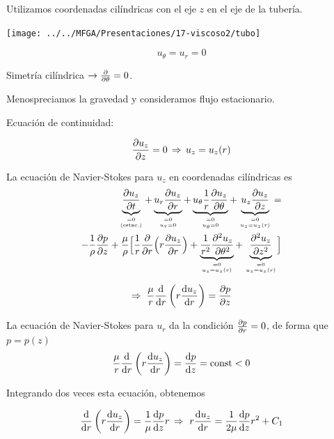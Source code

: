 	Utilizamos coordenadas cilíndricas con el eje $z$ en el eje de la
	tubería.

\begin{center}
	\texttt{[image: ../../MFGA/Presentaciones/17-viscoso2/tubo]}
\end{center}

			
			
\begin{equation}
				u_{\theta}=u_{r}=0
\end{equation}
			
			
			Simetría cilíndrica $\rightarrow\frac{\partial }{\partial \theta}=0$.
			
			Menospreciamos la gravedad y consideramos flujo estacionario.
			
			Ecuación de continuidad: 
			
\begin{equation}
				\frac{\partial u_{z}}{\partial z}=0\,\Rightarrow\,u_{z}=u_{z}(r)
\end{equation}
			
	
	La ecuación de Navier-Stokes para $u_{z}$ en coordenadas cilíndricas
	es
	\[
	\begin{split}\underbrace{\dparc{u_{z}}{t}}_{\binom{=0}{\text{(estac.)}}}+\underbrace{u_{r}\dparc{u_{z}}{r}}_{\binom{=0}{u_{r}=0}}+\underbrace{u_{\theta}\frac{1}{r}\dparc{u_{z}}{\theta}}_{\binom{=0}{u_{\theta}=0}}+\underbrace{u_{z}\dparc{u_{z}}{z}}_{\binom{=0}{u_{z}=u_{z}(r)}}=\\
		-\frac{1}{\rho}\dparc{p}{z}+\frac{\mu}{\rho}\Bigl[\frac{1}{r}\dparc{}{r}\Bigl(r\dparc{u_{z}}{r}\Bigr)+\underbrace{\frac{1}{r^{2}}\dparcsec{u_{z}}{\theta}}_{\binom{=0}{u_{z}=u_{z}(r)}}+\underbrace{\dparcsec{u_{z}}{z}}_{\binom{=0}{u_{z}=u_{z}(r)}}\Bigr]
	\end{split}
	\]
	
	
\begin{equation}
		\Rightarrow\;\frac{\mu}{r}\frac{\textrm{d} }{\textrm{d} r}\left(r\frac{\textrm{d} u_{z}}{\textrm{d} r}\right)=\frac{\partial p}{\partial z}
\end{equation}
	
	
	La ecuación de Navier-Stokes para $u_{r}$ da la condición $\frac{\partial p}{\partial r}=0$,
	de forma que $p=p(z)$ 
	\[
	\frac{\mu}{r}\frac{\textrm{d} }{\textrm{d} r}\left(r\frac{\textrm{d} u_{z}}{\textrm{d} r}\right)=\frac{\textrm{d} p}{\textrm{d} z}=\text{const}<0
	\]
	
	
	Integrando dos veces esta ecuación, obtenemos
	
	\[
	\frac{\textrm{d} }{\textrm{d} r}\left(r\frac{\textrm{d} u_{z}}{\textrm{d} r}\right)=\frac{1}{\mu}\frac{\textrm{d} p}{\textrm{d} z}r\,\Rightarrow\,\,r\frac{\textrm{d} u_{z}}{\textrm{d} r}=\frac{1}{2\mu}\frac{\textrm{d} p}{\textrm{d} z}r^{2}+C_{1}
	\]
	

